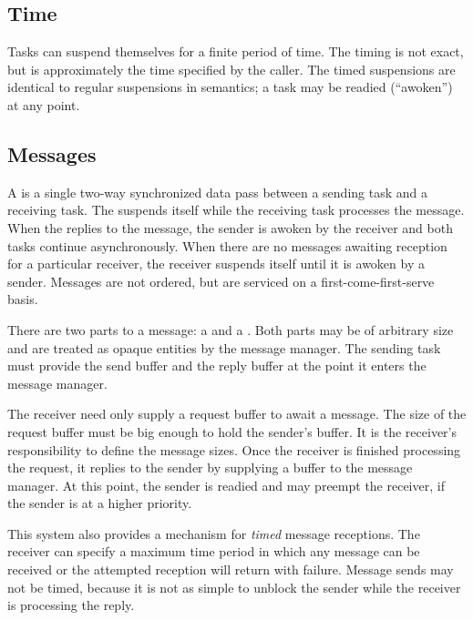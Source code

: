 \subsection{Time}
Tasks can suspend themselves for a finite period of time.
The timing is not exact, but is approximately the time
specified by the caller.  The timed suspensions
are identical to regular suspensions in semantics; 
a task may be readied (``awoken'') at any point.

\subsection{Messages}
A  is a single two-way synchronized data pass
between a sending task and a receiving task.  
The  suspends itself while the receiving task processes 
the message.
When the  replies to the message, the sender is awoken
by the receiver and both tasks continue asynchronously.
When there are no messages awaiting reception
for a particular receiver, the receiver suspends itself until it
is awoken by a sender.  Messages are not ordered, but are serviced
on a first-come-first-serve basis.

There are two parts to a message: a  and a .  
Both 
parts may be of arbitrary size and are treated as opaque entities by the
message manager.  The sending task must provide the send buffer and
the reply buffer at the point it enters the message manager.  

The receiver
need only supply a request buffer to await a message.  The size of the
request buffer must be big enough to hold the sender's buffer.  It is
the receiver's responsibility to define the message sizes. Once the
receiver is finished processing the request, it replies to the sender
by supplying a buffer to the message manager.  At this point, the
sender is readied and may preempt the receiver, if the sender is at a higher 
priority.

This system also provides a mechanism for {\em timed} message receptions.
The receiver can specify a maximum time period in which any message
can be received or the attempted reception will return with failure.  
Message
sends may not be timed, because it is not as simple to unblock the sender
while the receiver is processing the reply.  

